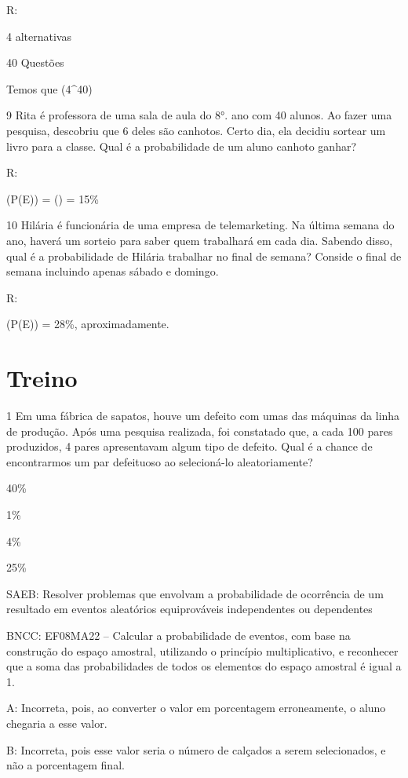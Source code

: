 {R:

4 alternativas

40 Questões

Temos que (4^{40})

\num{9} Rita é professora de uma sala de aula do 8°. ano com 40 alunos. Ao
fazer uma pesquisa, descobriu que 6 deles são canhotos. Certo dia, ela
decidiu sortear um livro para a classe. Qual é a probabilidade de um
aluno canhoto ganhar?

R:

(P(E)) = () = 15\%

\num{10} Hilária é funcionária de uma empresa de telemarketing. Na última
semana do ano, haverá um sorteio para saber quem trabalhará em cada dia.
Sabendo disso, qual é a probabilidade de Hilária trabalhar no final de
semana? Conside o final de semana incluindo apenas sábado e domingo.

R:

(P(E)) = 28\%, aproximadamente.

\section{Treino}

\num{1} Em uma fábrica de sapatos, houve um defeito com umas das máquinas da
linha de produção. Após uma pesquisa realizada, foi constatado que, a
cada 100 pares produzidos, 4 pares apresentavam algum tipo de defeito.
Qual é a chance de encontrarmos um par defeituoso ao selecioná-lo
aleatoriamente?
\item 40\%
\item 1\%
\item 4\%
\item 25\%

SAEB: Resolver problemas que envolvam a probabilidade de ocorrência de
um resultado em eventos aleatórios equiprováveis independentes ou
dependentes

BNCC: EF08MA22 -- Calcular a probabilidade de eventos, com base na
construção do espaço amostral, utilizando o princípio multiplicativo, e
reconhecer que a soma das probabilidades de todos os elementos do espaço
amostral é igual a 1.

A: Incorreta, pois, ao converter o valor em porcentagem erroneamente, o
aluno chegaria a esse valor.

B: Incorreta, pois esse valor seria o número de calçados a serem
selecionados, e não a porcentagem final.

}

